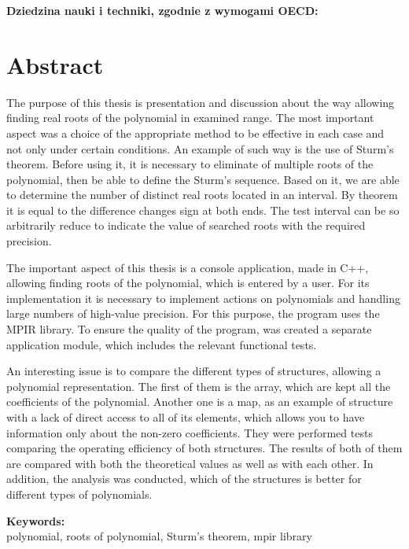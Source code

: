 \documentclass[oneside,a4paper]{book}
\begin{document}
	\vspace{12pt}
	\noindent\textbf{Dziedzina nauki i techniki, zgodnie z wymogami OECD:}\\
	
	\chapter*{Abstract}
	
	The purpose of this thesis is presentation and discussion about the way allowing finding real roots of the polynomial in examined range. The most important aspect was a choice of the appropriate method to be effective in each case and not only under certain conditions. An example of such way is the use of Sturm’s theorem. Before using it, it is necessary to eliminate of multiple roots of the polynomial, then be able to define the Sturm’s sequence. Based on it, we are able to determine the number of distinct real roots located in an interval. By theorem it is equal to the difference changes sign at both ends. The test interval can be so arbitrarily reduce to indicate the value of searched roots with the required precision.
	
	The important aspect of this thesis is a console application, made in C++, allowing finding roots of the polynomial, which is entered by a user. For its implementation it is necessary to implement actions on polynomials and handling large numbers of high-value precision. For this purpose, the program uses the MPIR library. To ensure the quality of the program, was created a separate application module, which includes the relevant functional tests.
	
	An interesting issue is to compare the different types of structures, allowing a polynomial representation. The first of them is the array, which are kept all the coefficients of the polynomial. Another one is a map, as an example of structure with a lack of direct access to all of its elements, which allows you to have information only about the non-zero coefficients. They were performed tests comparing the operating efficiency of both structures. The results of both of them are compared with both the theoretical values as well as with each other. In addition, the analysis was conducted, which of the structures is better for different types of polynomials.

	\vspace{12pt}
	\noindent\textbf{Keywords: }\\
	polynomial, roots of polynomial, Sturm’s theorem, mpir library
\end{document}
